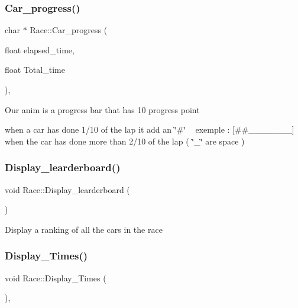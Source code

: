 \subsubsection{\texorpdfstring{Car\+\_\+progress()}{Car\_progress()}}
{\footnotesize\ttfamily char $\ast$ Race\+::\+Car\+\_\+progress (\begin{DoxyParamCaption}\item[{float}]{elapsed\+\_\+time,  }\item[{float}]{Total\+\_\+time }\end{DoxyParamCaption})\hspace{0.3cm}{\ttfamily [static]}, {\ttfamily [private]}}

Our anim is a progress bar that has 10 progress point

when a car has done 1/10 of the lap it add an \char`\"{}\#\char`\"{} ~\newline
 exemple \+: \mbox{[}\#\#\+\_\+\+\_\+\+\_\+\+\_\+\+\_\+\+\_\+\+\_\+\mbox{]} when the car has done more than 2/10 of the lap ( \char`\"{}\+\_\+\char`\"{} are space ) \mbox{\label{class_race_a60746a5c9eb52b2977a3c601a3c176d7}} 
\subsubsection{\texorpdfstring{Display\+\_\+learderboard()}{Display\_learderboard()}}
{\footnotesize\ttfamily void Race\+::\+Display\+\_\+learderboard (\begin{DoxyParamCaption}{ }\end{DoxyParamCaption})\hspace{0.3cm}{\ttfamily [static]}}

Display a ranking of all the cars in the race \mbox{\label{class_race_a45900e00f7218173658537ac6a2cda86}} 
\subsubsection{\texorpdfstring{Display\+\_\+\+Times()}{Display\_Times()}}
{\footnotesize\ttfamily void Race\+::\+Display\+\_\+\+Times (\begin{DoxyParamCaption}{ }\end{DoxyParamCaption})\hspace{0.3cm}{\ttfamily [static]}, {\ttfamily [private]}}

